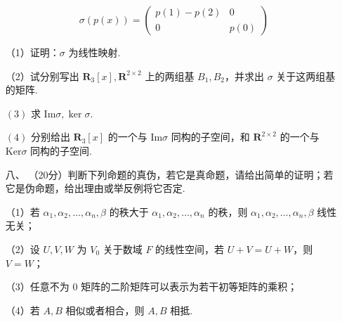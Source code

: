 \begin{enumerate}
	\[\sigma(p(x))=\begin{pmatrix}
	    p(1)-p(2)&0\\
	    0 & p(0)\end{pmatrix}\]

	（1）证明：$\sigma$ 为线性映射.

	（2）试分别写出 $\mathbf R_3[x],\mathbf R^{2\times 2}$ 上的两组基 $B_1,B_2$，并求出 $\sigma$ 关于这两组基的矩阵.

	$(3)$ 求 $\text{Im}\sigma,\ker\sigma$.

	$(4)$ 分别给出 $\mathbf R_3[x]$ 的一个与 $\text{Im}\sigma$ 同构的子空间，和 $\mathbf R^{2\times 2}$ 的一个与 $\text{Ker}\sigma$ 同构的子空间.
	\item[八、]（20分）判断下列命题的真伪，若它是真命题，请给出简单的证明；若它是伪命题，给出理由或举反例将它否定.

	（1）若 $\alpha_1,\alpha_2,\dots,\alpha_n,\beta$ 的秩大于 $\alpha_1,\alpha_2,\dots,\alpha_n$ 的秩，则 $\alpha_1,\alpha_2,\dots,\alpha_n,\beta$ 线性无关；

	（2）设 $U,V,W$ 为 $V_0$ 关于数域 $F$ 的线性空间，若 $U+V=U+W$，则 $V=W$；

	（3）任意不为 $0$ 矩阵的二阶矩阵可以表示为若干初等矩阵的乘积；

	（4）若 $A,B$ 相似或者相合，则 $A,B$ 相抵.
\end{enumerate}
\newpage
